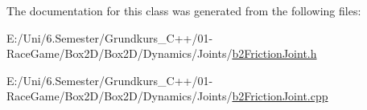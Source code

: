 The documentation for this class was generated from the following files\+:\begin{DoxyCompactItemize}
\item 
E\+:/\+Uni/6.\+Semester/\+Grundkurs\+\_\+\+C++/01-\/\+Race\+Game/\+Box2\+D/\+Box2\+D/\+Dynamics/\+Joints/\mbox{\hyperlink{b2_friction_joint_8h}{b2\+Friction\+Joint.\+h}}\item 
E\+:/\+Uni/6.\+Semester/\+Grundkurs\+\_\+\+C++/01-\/\+Race\+Game/\+Box2\+D/\+Box2\+D/\+Dynamics/\+Joints/\mbox{\hyperlink{b2_friction_joint_8cpp}{b2\+Friction\+Joint.\+cpp}}\end{DoxyCompactItemize}

